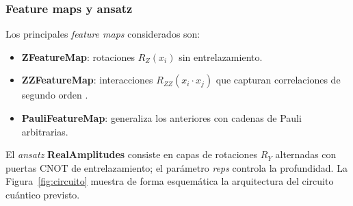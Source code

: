 \subsubsection{Feature maps y ansatz}
Los principales \textit{feature maps} considerados son:
\begin{itemize}
    \item \textbf{ZFeatureMap}: rotaciones $R_Z(x_i)$ sin entrelazamiento.
    \item \textbf{ZZFeatureMap}: interacciones $R_{ZZ}(x_i\cdot x_j)$
    que capturan correlaciones de segundo orden \citep{havlicek2019}.
    \item \textbf{PauliFeatureMap}: generaliza los anteriores con cadenas
    de Pauli arbitrarias.
\end{itemize}
El \textit{ansatz} \textbf{RealAmplitudes} consiste en capas de
rotaciones $R_Y$ alternadas con puertas $\mathrm{CNOT}$ de
entrelazamiento; el par\'ametro \textit{reps} controla la profundidad.
La Figura~\ref{fig:circuito} muestra de forma esquem\'atica la
arquitectura del circuito cu\'antico previsto.

